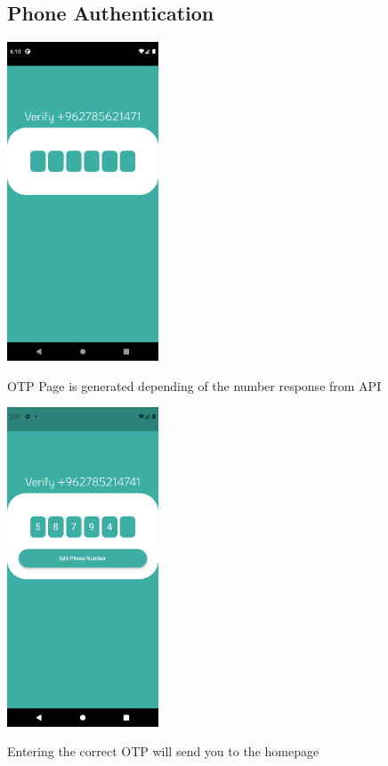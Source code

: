 \documentclass[12pt]{article}
\begin{document}
\begin{figure}[h!]
\subsection*{Phone Authentication}

{\includegraphics[width=0.4\textwidth]{./Screenshots/8.PNG}}
  \caption{OTP Page is generated depending of the number response from API}
  \end{figure}
  
  
\begin{figure}[h!]
{\includegraphics[width=0.4\textwidth]{./Screenshots/OTP.PNG}}
  \caption{Entering the correct OTP will send you to the homepage}
  \end{figure}
\end{document}
